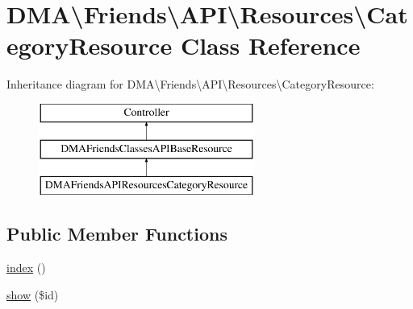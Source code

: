\hypertarget{classDMA_1_1Friends_1_1API_1_1Resources_1_1CategoryResource}{}\section{D\+M\+A\textbackslash{}Friends\textbackslash{}A\+P\+I\textbackslash{}Resources\textbackslash{}Category\+Resource Class Reference}
\label{classDMA_1_1Friends_1_1API_1_1Resources_1_1CategoryResource}
Inheritance diagram for D\+M\+A\textbackslash{}Friends\textbackslash{}A\+P\+I\textbackslash{}Resources\textbackslash{}Category\+Resource\+:\begin{figure}[H]
\begin{center}
\leavevmode
\includegraphics[height=3.000000cm]{df/d7c/classDMA_1_1Friends_1_1API_1_1Resources_1_1CategoryResource}
\end{center}
\end{figure}
\subsection*{Public Member Functions}
\begin{DoxyCompactItemize}
\item 
\hyperlink{classDMA_1_1Friends_1_1API_1_1Resources_1_1CategoryResource_aaf945d92cc5c44ba18e88ad12eccc865}{index} ()
\item 
\hyperlink{classDMA_1_1Friends_1_1API_1_1Resources_1_1CategoryResource_a666f9bd34c3abf91192321b9e0221007}{show} (\$id)
\end{DoxyCompactItemize}
